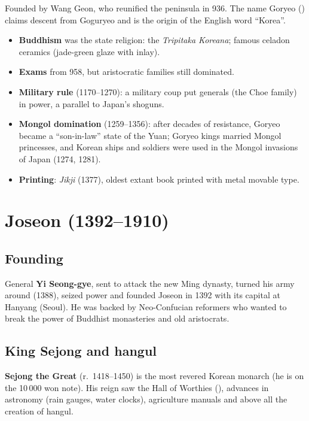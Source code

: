 Founded by Wang Geon, who reunified the peninsula in 936. The name Goryeo ()
claims descent from Goguryeo and is the origin of the English word ``Korea''.

\begin{itemize}
  \item \textbf{Buddhism} was the state religion: the \emph{Tripitaka Koreana}; famous
        celadon ceramics (jade-green glaze with inlay).
  \item \textbf{Exams} from 958, but aristocratic families still dominated.
  \item \textbf{Military rule} (1170--1270): a military coup put generals (the Choe family)
        in power, a parallel to Japan's shoguns.
  \item \textbf{Mongol domination} (1259--1356): after decades of resistance, Goryeo became
        a ``son-in-law'' state of the Yuan; Goryeo kings married Mongol princesses, and Korean
        ships and soldiers were used in the Mongol invasions of Japan (1274, 1281).
  \item \textbf{Printing}: \emph{Jikji} (1377), oldest extant book printed with metal
        movable type.
\end{itemize}

\section{Joseon (1392--1910)}

\subsection{Founding}

General \textbf{Yi Seong-gye}, sent to attack the new Ming dynasty, turned his army around
(1388), seized power and founded Joseon in 1392 with its capital at Hanyang (Seoul). He was
backed by Neo-Confucian reformers who wanted to break the power of Buddhist monasteries and
old aristocrats.

\subsection{King Sejong and hangul}

\textbf{Sejong the Great} (r.\ 1418--1450) is the most revered Korean monarch (he is on the
10\,000 won note). His reign saw the Hall of Worthies (), advances in astronomy
(rain gauges, water clocks), agriculture manuals and above all the creation of hangul.

